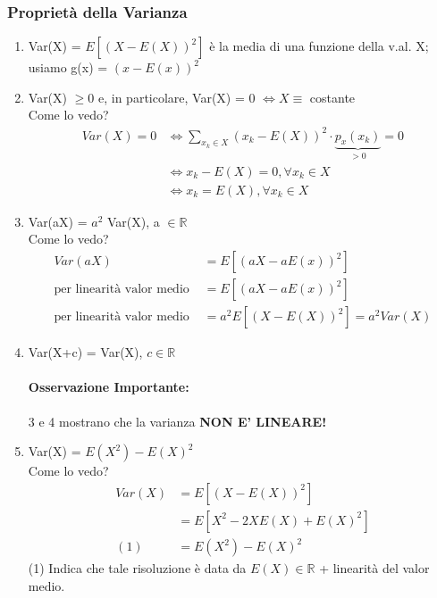 \documentclass{report}
\begin{document}
\subsubsection{Proprietà della Varianza}
\begin{enumerate}
    \item Var(X) = \(E[(X-E(X))^2]\) è la media di una funzione della v.al. X; usiamo g(x) = \((x-E(x))^2\)
    \item Var(X) \(\geq 0\) e, in particolare, Var(X) = 0 \(\Longleftrightarrow X \equiv\) costante\\
    Come lo vedo?\\
    \begin{align}
        Var(X) = 0 & \Longleftrightarrow \sum_{x_k \in \textit{X}}(x_k - E(X))^2 \cdot \underbrace{p_x(x_k)}_{> 0} = 0\\
        & \Longleftrightarrow x_k - E(X) = 0, \forall x_k \in \textit{X}\\
        & \Longleftrightarrow x_k = E(X), \forall x_k \in \textit{X}
    \end{align}
    \item Var(aX) = \(a^2\) Var(X), a \(\in \mathbb{R}\)\\
    Come lo vedo?
    \begin{align}
        Var(aX) & = E[(aX - aE(x))^2]\\
       \text{per linearità valor medio } & = E[(aX - aE(x))^2]\\
       \text{per linearità valor medio } & = a^2 E[(X - E(X))^2] = a^2 Var(X)
    \end{align}
    \item Var(X+c) = Var(X), \(c \in \mathbb{R}\)\\
    \paragraph{Osservazione Importante:} 3 e 4 mostrano che la varianza \textbf{NON E' LINEARE!}
    \item Var(X) = \(E(X^2) - E(X)^2\)\\
    Come lo vedo?
    \begin{align}
        Var(X) & = E[(X - E(X))^2]\\
        & = E[X^2 - 2XE(X) + E(X)^2]\\
    (1) & = E(X^2) - E(X)^2
    \end{align}
    (1) Indica che tale risoluzione è data da \(E(X) \in \mathbb{R}\) + linearità del valor medio.
\end{enumerate}
\end{document}
